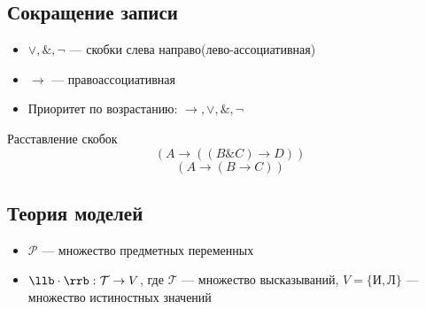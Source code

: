 \documentclass[oneside]{book}
\begin{document}
\subsection{Сокращение записи}
\label{sec:org543fb04}
\begin{itemize}
	\item \(\vee, \&, \neg\) --- скобки слева направо(лево-ассоциативная)
	\item \(\to\) --- правоассоциативная
	\item Приоритет по возрастанию: \(\to, \vee, \&, \neg\)
\end{itemize}
\begin{examp}
	Расставление скобок
	\[ \left(A \to \left( \left(B \& C\right) \to D\right)\right) \]
	\[ \left(A \to \left(B \to C\right)\right) \]
\end{examp}
\subsection{Теория моделей}
\label{sec:org19539a8}
\begin{itemize}
	\item \(\mathcal{P}\) --- множество предметных переменных
	\item \(\llb\cdot\rrb: \mathcal{T} \to V\), где \(\mathcal{T}\) --- множество высказываний, \(V = \{\text{И}, \text{Л}\}\) --- множество истиностных значений
\end{itemize}
\end{document}
